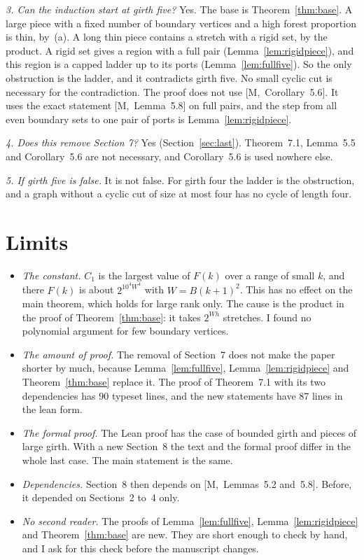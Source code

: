 \documentclass[11pt]{article}
\newcommand{\M}[1]{[M,~#1]}
\begin{document}
\emph{3. Can the induction start at girth five?} Yes. The base is Theorem~\ref{thm:base}. A
large piece with a fixed number of boundary vertices and a high forest proportion is thin,
by~(a). A long thin piece contains a stretch with a rigid set, by the product. A rigid set gives
a region with a full pair (Lemma~\ref{lem:rigidpiece}), and this region is a capped ladder up to
its ports (Lemma~\ref{lem:fullfive}). So the only obstruction is the ladder, and it contradicts
girth five. No small cyclic cut is necessary for the contradiction. The proof does not use
\M{Corollary~5.6}. It uses the exact statement \M{Lemma~5.8} on full pairs, and the step from
all even boundary sets to one pair of ports is Lemma~\ref{lem:rigidpiece}.

\emph{4. Does this remove Section 7?} Yes (Section~\ref{sec:last}). Theorem~7.1, Lemma~5.5 and
Corollary~5.6 are not necessary, and Corollary~5.6 is used nowhere else.

\emph{5. If girth five is false.} It is not false. For girth four the ladder is the
obstruction, and a graph without a cyclic cut of size at most four has no cycle of length four.

\section{Limits}\label{sec:limits}

\begin{itemize}[leftmargin=1.2em]
\item \emph{The constant.} $C_1$ is the largest value of $F(k)$ over a range of small $k$, and
there $F(k)$ is about $2^{10^{4}W^{4}}$ with $W=B(k+1)^{2}$. This has no effect on the main
theorem, which holds for large rank only. The cause is the product in the proof of
Theorem~\ref{thm:base}: it takes $2^{Wh}$ stretches. I found no polynomial argument for few
boundary vertices.
\item \emph{The amount of proof.} The removal of Section~7 does not make the paper shorter by
much, because Lemma~\ref{lem:fullfive}, Lemma~\ref{lem:rigidpiece} and Theorem~\ref{thm:base}
replace it. The proof of Theorem~7.1 with its two dependencies has 90 typeset lines, and the new
statements have 87 lines in the lean form.
\item \emph{The formal proof.} The Lean proof has the case of bounded girth and pieces of large
girth. With a new Section~8 the text and the formal proof differ in the whole last case. The
main statement is the same.
\item \emph{Dependencies.} Section~8 then depends on \M{Lemmas~5.2 and~5.8}. Before, it depended
on Sections~2 to~4 only.
\item \emph{No second reader.} The proofs of Lemma~\ref{lem:fullfive},
Lemma~\ref{lem:rigidpiece} and Theorem~\ref{thm:base} are new. They are short enough to check
by hand, and I ask for this check before the manuscript changes.
\end{itemize}
\end{document}
